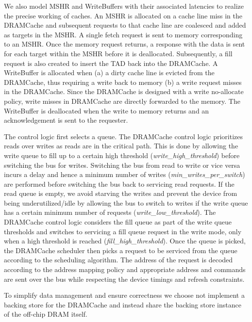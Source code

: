 \par We also model MSHR and WriteBuffers with their associated latencies to realize the precise working of caches. An MSHR is allocated on a cache line miss in the DRAMCache and subsequent requests to that cache line are coalesced and added as targets in the MSHR. A single fetch request is sent to memory corresponding to an MSHR. Once the memory request returns, a response with the data is sent for each target within the MSHR before it is deallocated. Subsequently, a fill request is also created to insert the TAD back into the DRAMCache. 
A WriteBuffer is allocated when (a) a dirty cache line is evicted from the DRAMCache, thus requiring a write back to memory (b) a write request misses in the DRAMCache. Since the DRAMCache is designed with a write no-allocate policy, write misses in DRAMCache are directly forwarded to the memory. The WriteBuffer is deallocated when the write to memory returns and an acknowledgement is sent to the requester. 
\par The control logic first selects a queue. The DRAMCache control logic prioritizes reads over writes as reads are in the critical path. This is done by allowing the write queue to fill up to a certain high threshold (\textit{write\_high\_threshold}) before switching the bus for writes. Switching the bus from read to write or vice versa incurs a delay and hence a minimum number of writes (\textit{min\_writes\_per\_switch}) are performed before switching the bus back to servicing read requests. If the read queue is empty, we avoid starving the writes and prevent the device from being underutilized/idle by allowing the bus to switch to writes if the write queue has a certain minimum number of requests (\textit{write\_low\_threshold}). The DRAMCache control logic considers the fill queue as part of the write queue thresholds and switches to servicing a fill queue request in the write mode, only when a high threshold is reached (\textit{fill\_high\_threshold}). Once the queue is picked, the DRAMCache scheduler then picks a request to be serviced from the queue according to the scheduling algorithm. The address of the request is decoded according to the  address mapping policy and appropriate address and commands are sent over the bus while respecting the device timings and refresh constraints.
\par To simplify data management and ensure correctness we choose not implement a backing store for the DRAMCache and instead share the backing store instance of the off-chip DRAM itself.


